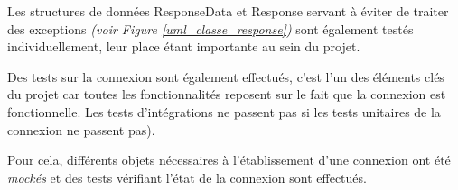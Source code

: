 \medbreak

Les structures de données ResponseData et Response servant à éviter de traiter des exceptions \textit{(voir Figure  \ref{uml_classe_response})} sont également testés individuellement, leur place étant importante au sein du projet.

\bigbreak
Des tests sur la connexion sont également effectués, c'est l'un des éléments clés du projet car toutes les fonctionnalités reposent sur le fait que la connexion est fonctionnelle. Les tests d'intégrations ne passent pas si les tests unitaires de la connexion ne passent pas).

Pour cela, différents objets nécessaires à l'établissement d'une connexion ont été \textit{mockés} et des tests vérifiant l'état de la connexion sont effectués.

